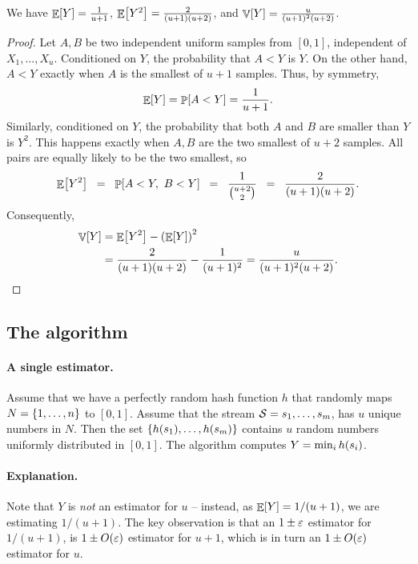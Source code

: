 \begin{lemma}
    We have $\mathop{\mathbb{E}}\!\left[ {Y} \right] = \frac{1}{u+1}$,
    $\mathop{\mathbb{E}}\!\left[ {Y^2} \right] = \frac{2}{(u+1)(u+2)}$, and
    $\mathop{\mathbb{V}}\!\left[ {Y} \right]=\frac{u}{(u+1)^2 (u+2)}$.
\end{lemma}
\begin{proof}
    Let $A,B$ be two independent uniform samples from $[0,1]$,
    independent of $X_1,\ldots,X_u$. Conditioned on $Y$, the probability
    that $A<Y$ is $Y$. On the other hand, $A<Y$ exactly when $A$ is
    the smallest of $u+1$ samples. Thus, by symmetry,
    \[
        \Ex{Y} = \Prob{A<Y} = \frac{1}{u+1}.
    \]
    Similarly, conditioned on $Y$, the probability that both $A$ and
    $B$ are smaller than $Y$ is $Y^2$. This happens exactly when
    $A,B$ are the two smallest of $u+2$ samples. All pairs are equally
    likely to be the two smallest, so
    \[
        \Ex{Y^2}%
        \EQ%
        \Prob{A<Y,\ B<Y}%
        \EQ%
        \frac{1}{\binom{u+2}{2}}%
        \EQ%
        \frac{2}{(u+1)(u+2)}.
    \]
    Consequently,
    \begin{align*}
        \Var{Y} &= \Ex{Y^2} - \pth{\Ex{Y}}^2\\
        &= \frac{2}{(u+1)(u+2)} - \frac{1}{(u+1)^2}
        = \frac{u}{(u+1)^2(u+2)}.
    \end{align*}
\end{proof}

\subsection{The algorithm}

\paragraph*{A single estimator.}



Assume that we have a perfectly random hash function $h$ that randomly
maps $N = \left\{ {1,\ldots, n} \right\}$ to $[0,1]$. Assume that the stream
$\mathcal{S}={s}_1,\ldots,{s}_m$, has $u$ unique numbers in $N$. Then the set
$\{h({s}_1),\ldots, h({s}_m)\}$ contains $u$ random numbers uniformly
distributed in $[0,1]$.  The algorithm computes $Y = \min_i h({s}_i)$.

\paragraph*{Explanation.}
Note that $Y$ is \emph{not} an estimator for $u$ -- instead, as
$\mathop{\mathbb{E}}\!\left[ {Y} \right] = 1/(u+1)$, we are estimating $1/(u+1)$. The key observation is
that an $1 \pm {\varepsilon}$ estimator for $1/(u+1)$, is $1 \pm O({\varepsilon})$ estimator for
$u+1$, which is in turn an $1 \pm O({\varepsilon})$ estimator for $u$.


